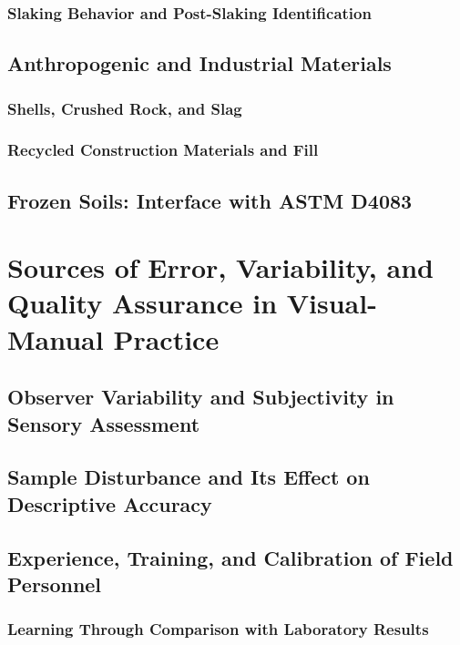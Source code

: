 \subsubsection{Slaking Behavior and Post-Slaking Identification}

\subsection{Anthropogenic and Industrial Materials}

\subsubsection{Shells, Crushed Rock, and Slag}

\subsubsection{Recycled Construction Materials and Fill}

\subsection{Frozen Soils: Interface with ASTM D4083}

\section{Sources of Error, Variability, and Quality Assurance in Visual-Manual Practice}

\subsection{Observer Variability and Subjectivity in Sensory Assessment}

\subsection{Sample Disturbance and Its Effect on Descriptive Accuracy}

\subsection{Experience, Training, and Calibration of Field Personnel}

\subsubsection{Learning Through Comparison with Laboratory Results}

